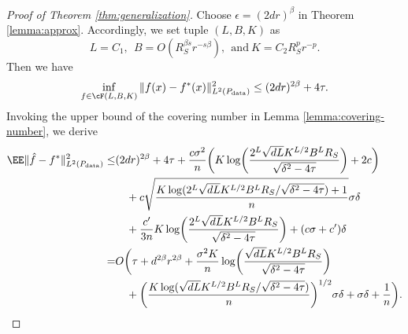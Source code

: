 \begin{proof}[Proof of Theorem \ref{thm:generalization}]
Choose $\epsilon=(2dr)^\beta $ in Theorem \ref{lemma:approx}.
Accordingly, we set tuple $(L,B,K)$ as
\begin{equation*}
     L=C_1,~~ B=O(R_S^{\beta s} r^{-s\beta}),~~ \text{and}~ K=C_2 R_S^p r^{-p}.
\end{equation*}
Then we have
\begin{equation*} 
    \inf_{f \in \cF( L, B, K)} \norm{ f(x) - f^*(x)}^2_{L^2(P_{\rm data})} \leq (2dr)^{2\beta} + 4\tau. 
\end{equation*} 
Invoking the upper bound of the covering number in Lemma \ref{lemma:covering-number}, we derive
\begin{align*}
    \EE \norm{ \hat{f} - f^*}^2_{L^2(P_{\rm data})} \leq& (2dr)^{2\beta} + 4\tau +  \frac{c\sigma^2}{n}  \bigg(  K \log\biggl( \frac{2^{L} \sqrt{dL} K^{L/2} B^L R_S }{\sqrt{\delta^2-4\tau}} \biggr) +2c \bigg) \\
        &\quad + c\sqrt{\frac{ K \log(2^{L} \sqrt{dL} K^{L/2} B^L R_S /\sqrt{\delta^2-4\tau}) +1}{n}} \sigma\delta \\
        &\quad + \frac{c'}{3n}   K \log\biggl( \frac{2^{L} \sqrt{dL} K^{L/2} B^L R_S }{\sqrt{\delta^2-4\tau}}  \biggr) +(c\sigma +c')\delta \\
        =& O\bigg( \tau + d^{2\beta} r^{2\beta} +  \frac{\sigma^2 K}{n} \log\biggl( \frac{ \sqrt{dL} K^{L/2} B^L R_S }{\sqrt{\delta^2-4\tau}}  \biggr) \\
        &\quad + \biggl(  \frac{K \log (\sqrt{dL} K^{L/2} B^L R_S /\sqrt{\delta^2-4\tau} ) }{n} \biggr)^{1/2}  \sigma \delta+ \sigma \delta+ \frac{1}{n}\bigg).

\end{align*}
\end{proof}
